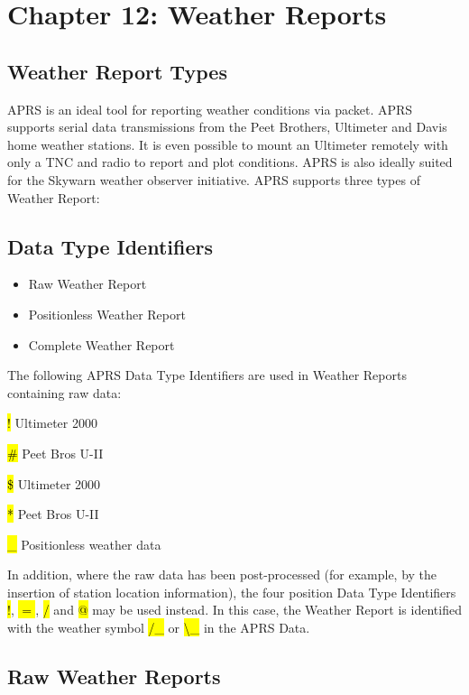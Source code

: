 \chapter{Chapter 12: Weather Reports}

\section{Weather Report Types}

APRS is an ideal tool for reporting weather conditions via packet. APRS
supports serial data transmissions from the Peet Brothers, Ultimeter and
Davis home weather stations. It is even possible to mount an Ultimeter
remotely with only a TNC and radio to report and plot conditions. APRS is
also ideally suited for the Skywarn weather observer initiative.
APRS supports three types of Weather Report:

\section{Data Type Identifiers}
\begin{itemize}
\item Raw Weather Report
\item Positionless Weather Report
\item Complete Weather Report
\end{itemize}

The following APRS Data Type Identifiers are used in Weather Reports
containing raw data:

\begin{description}
\item \hl{!} Ultimeter 2000
\item \hl{\#} Peet Bros U-II
\item \hl{\$} Ultimeter 2000
\item \hl{*} Peet Bros U-II
\item \hl{\_} Positionless weather data
\end{description}


In addition, where the raw data has been post-processed (for example,
by the insertion of station location information), the four position
Data Type Identifiers \hl{!}, \hl{$=$}, \hl{/} and \hl{@} may be used
instead. In this case, the Weather Report is identified with the
weather symbol \hl{/\_} or \hl{\textbackslash \_} in the APRS Data.


\section {Raw Weather Reports}

